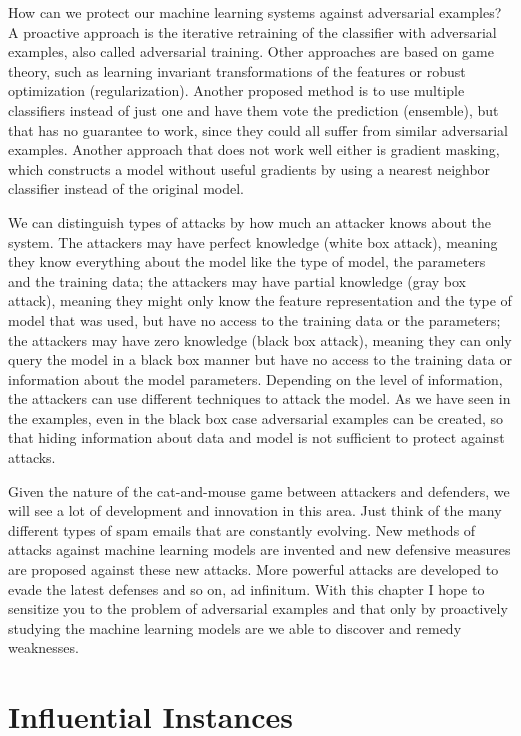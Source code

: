 \documentclass[
  12pt,
]{krantz}
\begin{document}
How can we protect our machine learning systems against adversarial examples?
A proactive approach is the iterative retraining of the classifier with adversarial examples, also called adversarial training.
Other approaches are based on game theory, such as learning invariant transformations of the features or robust optimization (regularization).
Another proposed method is to use multiple classifiers instead of just one and have them vote the prediction (ensemble), but that has no guarantee to work, since they could all suffer from similar adversarial examples.
Another approach that does not work well either is gradient masking, which constructs a model without useful gradients by using a nearest neighbor classifier instead of the original model.

We can distinguish types of attacks by how much an attacker knows about the system.
The attackers may have perfect knowledge (white box attack), meaning they know everything about the model like the type of model, the parameters and the training data;
the attackers may have partial knowledge (gray box attack), meaning they might only know the feature representation and the type of model that was used, but have no access to the training data or the parameters;
the attackers may have zero knowledge (black box attack), meaning they can only query the model in a black box manner but have no access to the training data or information about the model parameters.
Depending on the level of information, the attackers can use different techniques to attack the model.
As we have seen in the examples, even in the black box case adversarial examples can be created, so that hiding information about data and model is not sufficient to protect against attacks.

Given the nature of the cat-and-mouse game between attackers and defenders, we will see a lot of development and innovation in this area.
Just think of the many different types of spam emails that are constantly evolving.
New methods of attacks against machine learning models are invented and new defensive measures are proposed against these new attacks.
More powerful attacks are developed to evade the latest defenses and so on, ad infinitum.
With this chapter I hope to sensitize you to the problem of adversarial examples and that only by proactively studying the machine learning models are we able to discover and remedy weaknesses.

\newpage

\hypertarget{influential}{%
\section{Influential Instances}\label{influential}}
\end{document}
